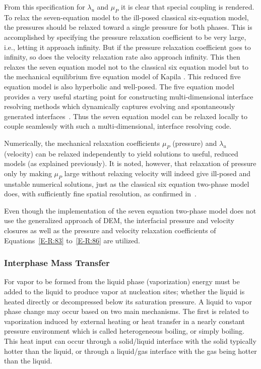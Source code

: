 From this specification for $\lambda_u$ and $\mu_P$ it is clear
that special coupling is rendered.  To relax the seven-equation model to
the ill-posed classical six-equation model, the pressures should be
relaxed toward a single pressure for both phases.  This is
accomplished by specifying the pressure relaxation coefficient to be
very large, i.e., letting it approach infinity.  But if the pressure
relaxation coefficient goes to infinity, so does the velocity
relaxation rate also approach infinity.  This then relaxes the
seven equation model not to the classical six equation model but to the
mechanical equilibrium five equation model of Kapila .  This reduced
five equation model is also hyperbolic and well-posed. The five equation
model provides a very useful starting point for constructing
multi-dimensional interface resolving methods which dynamically
captures evolving and spontaneously generated
interfaces~\cite{Saurel_2009}. Thus the seven equation model
can be relaxed locally to couple seamlessly with such a
multi-dimensional, interface resolving code.

Numerically, the mechanical relaxation coefficients $\mu_P$
(pressure) and $\lambda_u$ (velocity) can be relaxed independently to
yield solutions to useful, reduced models (as explained previously).  It
is noted, however, that relaxation of pressure only by making $\mu_P$
large without relaxing velocity will indeed give ill-posed and
unstable numerical solutions, just as the classical six equation
two-phase model does, with sufficiently fine spatial resolution, as
confirmed in~\cite{SEM,Herrard_2005}.

Even though the implementation of the seven equation two-phase
model does not use
the generalized approach of DEM, the interfacial pressure and velocity
closures as well as the pressure and velocity relaxation coefficients
of Equations~\eqref{E-R:83} to~\eqref{E-R:86} are utilized.
\subsubsection{Interphase Mass Transfer}
For vapor to be formed from the liquid phase (vaporization) energy
must be added to the liquid to produce vapor at nucleation sites;
whether the liquid is heated directly or decompressed below its
saturation pressure.  A liquid to vapor phase change may occur based
on two main mechanisms.  The first is related to vaporization induced
by external heating or heat transfer in a nearly constant pressure
environment which is called heterogeneous boiling, or simply
boiling.  This heat input can occur through a solid/liquid
interface with the solid typically hotter than the liquid, or through
a liquid/gas interface with the gas being hotter than the liquid.

